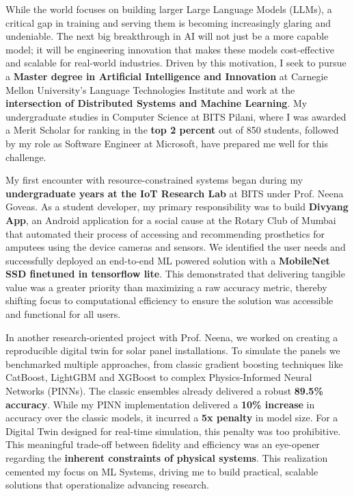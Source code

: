 \documentclass[12pt]{article}
\begin{document}

While the world focuses on building larger Large Language Models (LLMs), a critical gap in training and serving them is becoming increasingly glaring and undeniable. The next big breakthrough in AI will not just be a more capable model; it will be engineering innovation that makes these models cost-effective and scalable for real-world industries. Driven by this motivation, I seek to pursue a \textbf{Master degree in Artificial Intelligence and Innovation} at Carnegie Mellon University’s Language Technologies Institute and work at the \textbf{intersection of Distributed Systems and Machine Learning}. My undergraduate studies in Computer Science at BITS Pilani, where I was awarded a Merit Scholar for ranking in the \textbf{top 2 percent} out of 850 students, followed by my role as Software Engineer at Microsoft, have prepared me well for this challenge.

\vspace{0.5em}
My first encounter with resource-constrained systems began during my \textbf{undergraduate years at the IoT Research Lab} at BITS under Prof. Neena Goveas. As a student developer, my primary responsibility was to build \textbf{Divyang App}, an Android application for a social cause at the Rotary Club of Mumbai that automated their process of accessing and recommending prosthetics for amputees using the device cameras and sensors. We identified the user needs and successfully deployed an end-to-end ML powered solution with a \textbf{MobileNet SSD finetuned in tensorflow lite}. This demonstrated that delivering tangible value was a greater priority than maximizing a raw accuracy metric, thereby shifting focus to computational efficiency to ensure the solution was accessible and functional for all users.

\vspace{0.5em}
In another research-oriented project with Prof. Neena, we worked on creating a reproducible digital twin for solar panel installations. To simulate the panels we benchmarked multiple approaches, from classic gradient boosting techniques like CatBoost, LightGBM and XGBoost to complex Physics-Informed Neural Networks (PINNs). The classic ensembles already delivered a robust \textbf{89.5\% accuracy}. While my PINN implementation delivered a \textbf{10\% increase} in accuracy over the classic models, it incurred a \textbf{5x penalty} in model size.  For a Digital Twin designed for real-time simulation, this penalty was too prohibitive. This meaningful trade-off between fidelity and efficiency was an eye-opener regarding the \textbf{inherent constraints of physical systems}. This realization cemented my focus on ML Systems, driving me to build practical, scalable solutions that operationalize advancing research.
\end{document}
